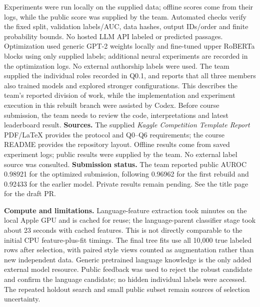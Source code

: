\documentclass[10pt,letterpaper]{article}
\begin{document}
Experiments were run locally on the supplied data; offline scores come from their logs, while the public score was supplied by the team.
Automated checks verify the fixed split, validation labels/AUC, data hashes, output IDs/order and finite probability bounds.
No hosted LLM API labeled or predicted passages. Optimization used generic GPT-2 weights locally and fine-tuned upper RoBERTa blocks using only supplied labels; additional neural experiments are recorded in the optimization logs. No external authorship labels were used.
The team supplied the individual roles recorded in Q0.1, and reports that all three members also trained models and explored stronger configurations.
This describes the team's reported division of work, while the implementation and experiment execution in this rebuilt branch were assisted by Codex.
Before course submission, the team needs to review the code, interpretations and latest leaderboard result.
\vspace{.1in}
\textbf{Sources.} The supplied \emph{Kaggle Competition Template Report} PDF/LaTeX provides the protocol and Q0--Q6 requirements; the course README provides the repository layout. Offline results come from saved experiment logs; public results were supplied by the team. No external label source was consulted.
\vspace{.1in}
\textbf{Submission status.}
The team reported public AUROC 0.98921 for the optimized submission, following 0.96962 for the first rebuild and 0.92433 for the earlier model. Private results remain pending. See the title page for the draft PR.

\textbf{Compute and limitations.} Language-feature extraction took minutes on the local Apple GPU and is cached for reuse; the language-parent classifier stage took about 23 seconds with cached features. This is not directly comparable to the initial CPU feature-plus-fit timings. The final tree fits use all 10,000 true labeled rows after selection, with paired style views counted as augmentation rather than new independent data. Generic pretrained language knowledge is the only added external model resource. Public feedback was used to reject the robust candidate and confirm the language candidate; no hidden individual labels were accessed. The repeated holdout search and small public subset remain sources of selection uncertainty.

\newpage
\end{document}
